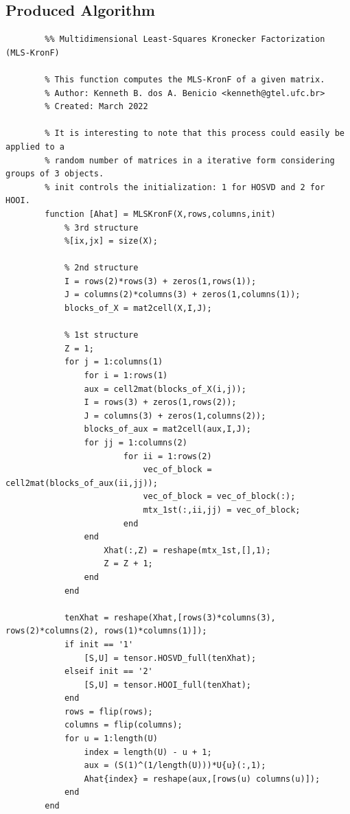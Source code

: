\documentclass[a4paper,10pt]{article}
\begin{document}
    

    \newpage
    \subsection*{Produced Algorithm}

    \begin{verbatim}
        %% Multidimensional Least-Squares Kronecker Factorization (MLS-KronF)

        % This function computes the MLS-KronF of a given matrix.   
        % Author: Kenneth B. dos A. Benicio <kenneth@gtel.ufc.br>
        % Created: March 2022
        
        % It is interesting to note that this process could easily be applied to a
        % random number of matrices in a iterative form considering groups of 3 objects.
        % init controls the initialization: 1 for HOSVD and 2 for HOOI.
        function [Ahat] = MLSKronF(X,rows,columns,init)
            % 3rd structure
            %[ix,jx] = size(X);
            
            % 2nd structure
            I = rows(2)*rows(3) + zeros(1,rows(1));
            J = columns(2)*columns(3) + zeros(1,columns(1));
            blocks_of_X = mat2cell(X,I,J);
            
            % 1st structure
            Z = 1;
            for j = 1:columns(1)
                for i = 1:rows(1)
                aux = cell2mat(blocks_of_X(i,j));
                I = rows(3) + zeros(1,rows(2));
                J = columns(3) + zeros(1,columns(2));
                blocks_of_aux = mat2cell(aux,I,J);
                for jj = 1:columns(2)
                        for ii = 1:rows(2)
                            vec_of_block = cell2mat(blocks_of_aux(ii,jj));
                            vec_of_block = vec_of_block(:);
                            mtx_1st(:,ii,jj) = vec_of_block;
                        end
                end
                    Xhat(:,Z) = reshape(mtx_1st,[],1);
                    Z = Z + 1;
                end 
            end
            
            tenXhat = reshape(Xhat,[rows(3)*columns(3), rows(2)*columns(2), rows(1)*columns(1)]);
            if init == '1'
                [S,U] = tensor.HOSVD_full(tenXhat);
            elseif init == '2'
                [S,U] = tensor.HOOI_full(tenXhat);
            end
            rows = flip(rows);
            columns = flip(columns);
            for u = 1:length(U)
                index = length(U) - u + 1;
                aux = (S(1)^(1/length(U)))*U{u}(:,1);
                Ahat{index} = reshape(aux,[rows(u) columns(u)]);
            end
        end


\end{verbatim}
\end{document}
